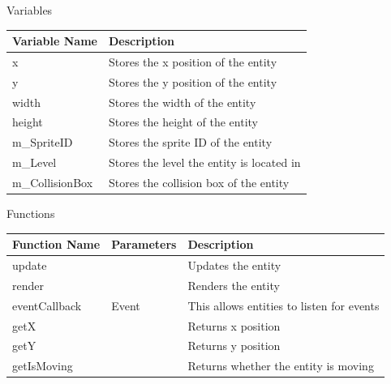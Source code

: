 \documentclass{article}
\begin{document}
                \begin{center}
                    Variables
                    \begin{tabular}{ | m{} | m{} | }
                        \hline
                        \textbf{Variable Name} & \textbf{Description} \\
                        \hline
                        x & Stores the x position of the entity \\
                        \hline
                        y & Stores the y position of the entity \\
                        \hline
                        width & Stores the width of the entity \\
                        \hline
                        height & Stores the height of the entity \\
                        \hline
                        m\_SpriteID & Stores the sprite ID of the entity \\
                        \hline
                        m\_Level & Stores the level the entity is located in \\
                        \hline
                        m\_CollisionBox & Stores the collision box of the entity \\
                        \hline
                    \end{tabular}
                    Functions
                    \begin{tabular}{ | m{} | m{}| m{} | }
                        \hline
                        \textbf{Function Name} & \textbf{Parameters} & \textbf{Description} \\
                        \hline
                        update & & Updates the entity \\
                        \hline
                        render & & Renders the entity \\
                        \hline
                        eventCallback & Event & This allows entities to listen for events \\
                        \hline
                        getX & & Returns x position \\
                        \hline
                        getY & & Returns y position \\
                        \hline
                        getIsMoving & & Returns whether the entity is moving \\

\end{tabular}
\end{center}
\end{document}
